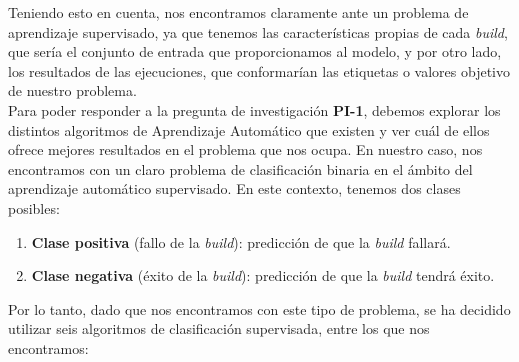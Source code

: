 Teniendo esto en cuenta, nos encontramos claramente ante un problema de aprendizaje supervisado,
ya que tenemos las características propias de cada \textit{build}, que sería el conjunto de
entrada que proporcionamos al modelo, y por otro lado, los resultados de las ejecuciones, que
conformarían las etiquetas o valores objetivo de nuestro problema.\\

Para poder responder a la pregunta de investigación \textbf{PI-1}, debemos explorar los
distintos algoritmos de Aprendizaje Automático que existen y ver cuál de ellos ofrece mejores
resultados en el problema que nos ocupa. En nuestro caso, nos encontramos con un claro problema
de clasificación binaria en el ámbito del aprendizaje automático supervisado. En este contexto,
tenemos dos clases posibles:
\begin{enumerate}
    \item \textbf{Clase positiva} (fallo de la \textit{build}): predicción de que la \textit{build}
    fallará.\\
    \item \textbf{Clase negativa} (éxito de la \textit{build}): predicción de que la \textit{build}
    tendrá éxito.
\end{enumerate}

Por lo tanto, dado que nos encontramos con este tipo de problema, se ha decidido utilizar seis
algoritmos de clasificación supervisada, entre los que nos encontramos:

